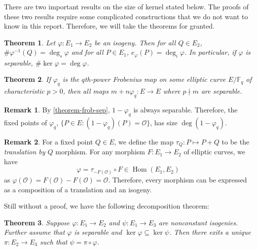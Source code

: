 \documentclass[12pt]{article}
\newtheorem{theorem}{Theorem}[subsection]
\theoremstyle{remark}
\theoremstyle{definition}
\newtheorem{remark}{Remark}[subsection]
\newcommand{\F}[0]{\mathbb{F}}
\newcommand{\ecO}[0]{\mathcal O}
\newcommand{\Hom}[0]{\operatorname{Hom}}
\begin{document}
    There are two important results on the size of kernel stated below. The proofs of these two results require some complicated constructions that we do not want to know in this report. Therefore, we will take the theorems for granted.
    \begin{theorem}\label{theorem-size-ker-iso}
        Let $\varphi:E_1\to E_2$ be an isogeny. Then for all $Q\in E_2$, $\#\varphi^{-1}(Q)=\deg_s\varphi$ and for all $P\in E_1$, $e_\varphi(P)=\deg_i\varphi$. In particular, if $\varphi$ is separable, $\#\ker\varphi=\deg\varphi$.
    \end{theorem}
    \begin{theorem}\label{theorem-frob-sep}
        If $\varphi_q$ is the $q$th-power Frobenius map on some elliptic curve $E/\F_q$ of characteristic $p>0$, then all maps $m+n\varphi_q:E\to E$ where $p\nmid m$ are separable.
    \end{theorem}
    \begin{remark}
        By \autoref{theorem-frob-sep}, $1-\varphi_q$ is always separable. Therefore, the fixed points of $\varphi_q$, $\{P\in E:(1-\varphi_q)(P)=\ecO\}$, has size $\deg(1-\varphi_q)$.
    \end{remark}
    \begin{remark}\label{remark-translation}
        For a fixed point $Q\in E$, we define the map $\tau_Q:P\mapsto P+Q$ to be the \textit{translation by $Q$} morphism. For any morphism $F:E_1\to E_2$ of elliptic curves, we have
        \[\varphi=\tau_{-F(\ecO)}\circ F\in\Hom(E_1,E_2)\]
        as $\varphi(\ecO)=F(\ecO)-F(\ecO)=\ecO$. Therefore, every morphism can be expressed as a composition of a translation and an isogeny.
    \end{remark}
    Still without a proof, we have the following decomposition theorem:
    \begin{theorem}\label{theorem-isogeny-decomp}
        Suppose $\varphi:E_1\to E_2$ and $\psi:E_1\to E_3$ are nonconstant isogenies. Further assume that $\varphi$ is separable and $\ker\varphi\subseteq\ker\psi$. Then there exits a unique $\pi:E_2\to E_3$ such that $\psi=\pi\circ\varphi$.
    \end{theorem}
    
    
\end{document}
